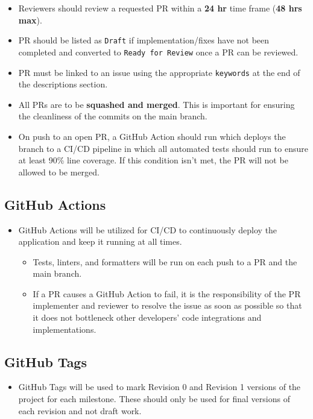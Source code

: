 \documentclass{article}
\begin{document}
\begin{itemize}
    \item Reviewers should review a requested PR within a \textbf{24 hr} time
    frame (\textbf{48 hrs max}).
    \item PR should be listed as \texttt{Draft} if implementation/fixes have not
    been completed and converted to \texttt{Ready for Review} once a PR can be
    reviewed.
    \item PR must be linked to an issue using the appropriate \texttt{keywords}
    at the end of the descriptions section.
    \item All PRs are to be \textbf{squashed and merged}. This is important for
    ensuring the cleanliness of the commits on the main branch.
    \item On push to an open PR, a GitHub Action should run which deploys the
    branch to a CI/CD pipeline in which all automated tests should run to ensure
    at least 90\% line coverage. If this condition isn't met, the PR will not be
    allowed to be merged.
\end{itemize}

\subsection{GitHub Actions}
\begin{itemize}
    \item GitHub Actions will be utilized for CI/CD to continuously deploy the
    application and keep it running at all times.
    \begin{itemize}
        \item Tests, linters, and formatters will be run on each push to a PR
        and the main branch.
        \item If a PR causes a GitHub Action to fail, it is the responsibility
        of the PR implementer and reviewer to resolve the issue as soon as
        possible so that it does not bottleneck other developers' code
        integrations and implementations.
    \end{itemize}
\end{itemize}

\subsection{GitHub Tags}
\begin{itemize}
    \item GitHub Tags will be used to mark Revision 0 and Revision 1 versions of
    the project for each milestone. These should only be used for final versions
    of each revision and not draft work.
\end{itemize}
\end{document}
